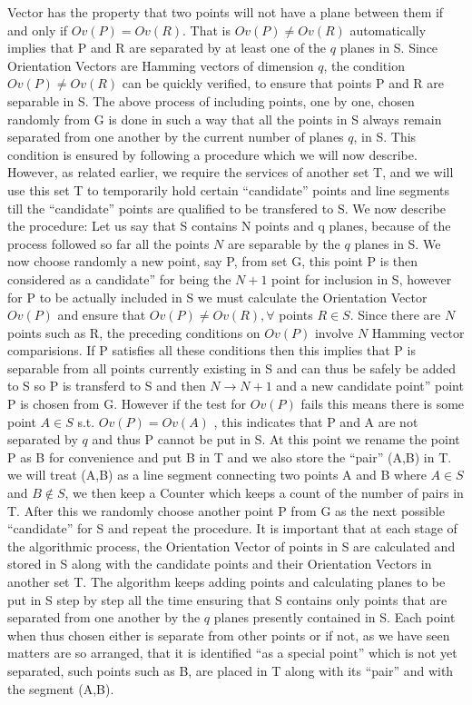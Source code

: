 \documentclass[english]{article}
\begin{document}
Vector has the property that two points will not have a plane between
them if and only if $Ov(P)=Ov(R)$. That is $Ov(P)\ne Ov(R)$ automatically
implies that P and R are separated by at least one of the $q$ planes
in S. Since Orientation Vectors are Hamming vectors of dimension $q$,
the condition $Ov(P)\ne Ov(R)$ can be quickly verified, to ensure
that points P and R are separable in S. The above process of including
points, one by one, chosen randomly from G is done in such a way that
all the points in S always remain separated from one another by the
current number of planes $q$, in S. This condition is ensured by
following a procedure which we will now describe. However, as related
earlier, we require the services of another set T, and we will use
this set T to temporarily hold certain {}``candidate'' points and
line segments till the {}``candidate'' points are qualified to be
transfered to S. We now describe the procedure: Let us say that S
contains N points and q planes, because of the process followed so
far all the points $N$ are separable by the $q$ planes in S. We
now choose randomly a new point, say P, from set G, this point P is
then considered as a \textquotedbl{}candidate'' for being the $N+1$
point for inclusion in S, however for P to be actually included in
S we must calculate the Orientation Vector $Ov(P)$ and ensure that
$Ov(P)\ne Ov(R),\forall$ points $R\in S$. Since there are $N$ points
such as R, the preceding conditions on $Ov(P)$ involve $N$ Hamming
vector comparisions. If P satisfies all these conditions then this
implies that P is separable from all points currently existing in
S and can thus be safely be added to S so P is transferd to S and
then $N\rightarrow N+1$ and a new \textquotedbl{}candidate point''
point P is chosen from G. However if the test for $Ov(P)$ fails this
means there is some point $A\in S$ s.t. $Ov(P)=Ov(A)$ , this indicates
that P and A are not separated by $q$ and thus P cannot be put in
S. At this point we rename the point P as B for convenience and put
B in T and we also store the {}``pair'' (A,B) in T. we will treat
(A,B) as a line segment connecting two points A and B where $A\in S$
and $B\notin S$, we then keep a Counter which keeps a count of the
number of pairs in T. After this we randomly choose another point
P from G as the next possible {}``candidate'' for S and repeat the
procedure. It is important that at each stage of the algorithmic process,
the Orientation Vector of points in S are calculated and stored in
S along with the \textquotedbl{}candidate\textquotedbl{} points and
their Orientation Vectors in another set T. The algorithm keeps adding
points and calculating planes to be put in S step by step all the
time ensuring that S contains only points that are separated from
one another by the $q$ planes presently contained in S. Each point
when thus chosen either is separate from other points or if not, as
we have seen matters are so arranged, that it is identified {}``as
a special point'' which is not yet separated, such points such as
B, are placed in T along with its {}``pair'' and with the segment
(A,B).
\end{document}
